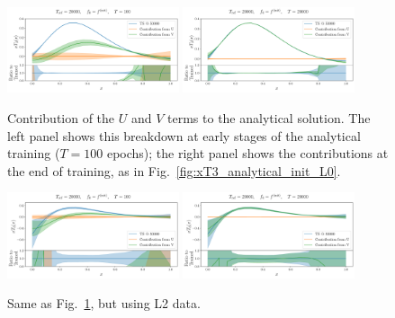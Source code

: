 \begin{figure}[ht!]
    \centering
    \includegraphics[width=0.45\textwidth]{plots/analytical_solution/xT3/u_v_decomposition/L0/linear/evolution_u_v_100_L0_linear.pdf}
    \includegraphics[width=0.45\textwidth]{plots/analytical_solution/xT3/u_v_decomposition/L0/linear/evolution_u_v_20000_L0_linear.pdf}
    \caption{Contribution of the $U$ and $V$ terms to the analytical solution. The left
    panel shows this breakdown at early stages of the analytical training
    ($T=100$ epochs); the right panel shows the contributions at the end of
    training, as in Fig.~\ref{fig:xT3_analytical_init_L0}.}
    \label{fig:xT3_u_v_contributions_L0}
  \end{figure}

  \begin{figure}[ht!]
    \centering
    \includegraphics[width=0.45\textwidth]{plots/analytical_solution/xT3/u_v_decomposition/L2/linear/evolution_u_v_100_L2_linear.pdf}
    \includegraphics[width=0.45\textwidth]{plots/analytical_solution/xT3/u_v_decomposition/L2/linear/evolution_u_v_20000_L2_linear.pdf}
    \caption{Same as Fig.~\ref{fig:xT3_u_v_contributions_L0}, but using L2 data.}
    \label{fig:xT3_u_v_contributions_L2}
  \end{figure}

